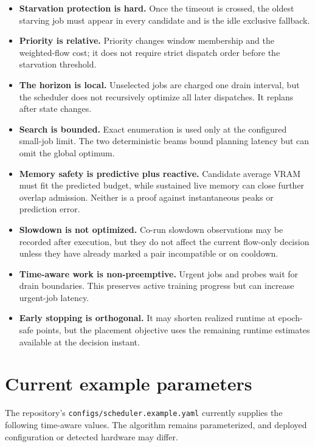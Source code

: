 \documentclass[11pt]{article}
\newcommand{\code}[1]{\textcolor{codeblue}{\texttt{#1}}}
\begin{document}
\begin{itemize}[leftmargin=*]
  \item \textbf{Starvation protection is hard.}  Once the timeout is crossed,
        the oldest starving job must appear in every candidate and is the idle
        exclusive fallback.
  \item \textbf{Priority is relative.}  Priority changes window membership and
        the weighted-flow cost; it does not require strict dispatch order before
        the starvation threshold.
  \item \textbf{The horizon is local.}  Unselected jobs are charged one drain
        interval, but the scheduler does not recursively optimize all later
        dispatches.  It replans after state changes.
  \item \textbf{Search is bounded.}  Exact enumeration is used only at the
        configured small-job limit.  The two deterministic beams bound planning
        latency but can omit the global optimum.
  \item \textbf{Memory safety is predictive plus reactive.}  Candidate average
        VRAM must fit the predicted budget, while sustained live memory can close
        further overlap admission.  Neither is a proof against instantaneous
        peaks or prediction error.
  \item \textbf{Slowdown is not optimized.}  Co-run slowdown observations may be
        recorded after execution, but they do not affect the current flow-only
        decision unless they have already marked a pair incompatible or on
        cooldown.
  \item \textbf{Time-aware work is non-preemptive.}  Urgent jobs and probes wait
        for drain boundaries.  This preserves active training progress but can
        increase urgent-job latency.
  \item \textbf{Early stopping is orthogonal.}  It may shorten realized runtime
        at epoch-safe points, but the placement objective uses the remaining
        runtime estimates available at the decision instant.
\end{itemize}

\section{Current example parameters}

The repository's \code{configs/scheduler.example.yaml} currently supplies the
following time-aware values.  The algorithm remains parameterized, and deployed
configuration or detected hardware may differ.
\end{document}

